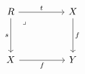 \[\begin{tikzcd}
	R && X \\
	\\
	X && Y
	\arrow["f"', from=3-1, to=3-3]
	\arrow["f", from=1-3, to=3-3]
	\arrow["s"', from=1-1, to=3-1]
	\arrow["t", from=1-1, to=1-3]
	\arrow["\lrcorner"{anchor=center, pos=0.125}, draw=none, from=1-1, to=3-3]
\end{tikzcd}\]